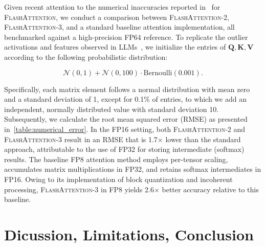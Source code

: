 \begin{algorithm}[H]
\begin{algorithmic}[1]
Given recent attention to the numerical inaccuracies reported in~\citep{golden2024flash} for \textsc{FlashAttention}, we conduct a comparison between \textsc{FlashAttention-2}, \textsc{FlashAttention-3}, and a standard baseline attention implementation, all benchmarked against a high-precision FP64 reference. To replicate the outlier activations and features observed in LLMs~\citep{dettmers2208llm, sun2024massive}, we initialize the entries of $\mathbf{Q}, \mathbf{K}, \mathbf{V}$ according to the following probabilistic distribution:

\begin{equation*}
  \mathcal{N}(0, 1) + \mathcal{N}(0, 100) \cdot \mathrm{Bernoulli}(0.001).
\end{equation*}

Specifically, each matrix element follows a normal distribution with mean zero and a standard deviation of 1, except for 0.1\% of entries, to which we add an independent, normally distributed value with standard deviation 10. Subsequently, we calculate the root mean squared error (RMSE) as presented in~\cref{table:numerical_error}. In the FP16 setting, both \textsc{FlashAttention-2} and \textsc{FlashAttention-3} result in an RMSE that is 1.7$\times$ lower than the standard approach, attributable to the use of FP32 for storing intermediate (softmax) results. The baseline FP8 attention method employs per-tensor scaling, accumulates matrix multiplications in FP32, and retains softmax intermediates in FP16. Owing to its implementation of block quantization and incoherent processing, \textsc{FlashAttention-3} in FP8 yields 2.6$\times$ better accuracy relative to this baseline.

\section{Dicussion, Limitations, Conclusion}
\label{sec:discussion}


\end{algorithmic}
\end{algorithm}
